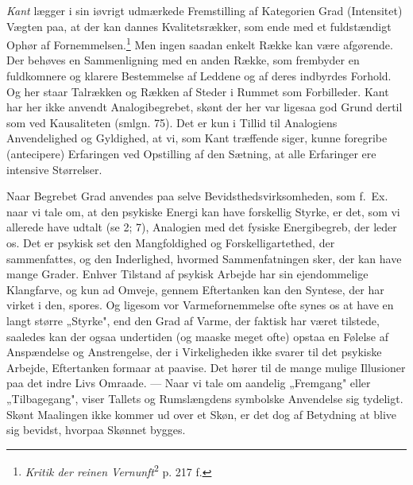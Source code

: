 \documentclass[12pt,a4paper]{book}
\newcommand{\apage}[1]{\marginnote{\footnotesize\textit{[#1]}}}
\begin{document}
\emph{Kant} lægger i sin iøvrigt udmærkede Fremstilling af Kategorien
Grad (Intensitet) Vægten paa, at der kan dannes Kvalitetsrækker, som
ende med et fuldstændigt Ophør af Fornemmelsen.\footnote{\emph{Kritik
der reinen Vernunft}\textsuperscript{2} p. 217 f.} Men ingen saadan
enkelt Række kan være afgørende. Der behøves en Sammenligning med en
anden Række, som frembyder en fuldkomnere og klarere Bestemmelse af
Leddene og af deres indbyrdes Forhold. Og her staar Talrækken og Rækken
af Steder i Rummet som Forbilleder. Kant har her ikke anvendt
Analogibegrebet, skønt der her var ligesaa god Grund dertil som ved
Kausaliteten (smlgn. 75). Det er kun i Tillid til Analogiens
Anvendelighed og Gyldighed, at vi, som Kant træffende siger, kunne
foregribe (antecipere) Erfaringen ved Opstilling af den Sætning, at alle
Erfaringer ere intensive Størrelser.

Naar Begrebet Grad anvendes paa selve Bevidsthedsvirksomheden, som f.\
Ex. naar vi tale om, at den psykiske Energi kan have forskellig Styrke,
er det, som vi allerede have udtalt (se 2; 7), Analogien med det fysiske
Energibegreb, der leder os. Det er psykisk set den Mangfoldighed og
Forskelligartethed, der sammenfattes, og den Inderlighed, hvormed
Sammenfatningen sker, der kan have mange Grader. Enhver Tilstand af
psykisk Arbejde har sin ejendommelige Klangfarve, og kun ad Omveje,
gennem Eftertanken kan den Syntese, der har virket i den, spores. Og
ligesom vor Varmefornemmelse ofte synes os at have en langt større
„Styrke", end den Grad af Varme, der faktisk har været tilstede,
saaledes kan der ogsaa undertiden (og maaske meget ofte) opstaa en
Følelse af Anspændelse og Anstrengelse, der i \apage{196} Virkeligheden ikke svarer
til det psykiske Arbejde, Eftertanken formaar at paavise. Det hører til
de mange mulige Illusioner paa det indre Livs Omraade. --- Naar vi tale
om aandelig „Fremgang" eller „Tilbagegang", viser Tallets og
Rumslængdens symbolske Anvendelse sig tydeligt. Skønt Maalingen ikke
kommer ud over et Skøn, er det dog af Betydning at blive sig bevidst,
hvorpaa Skønnet bygges.
\end{document}
